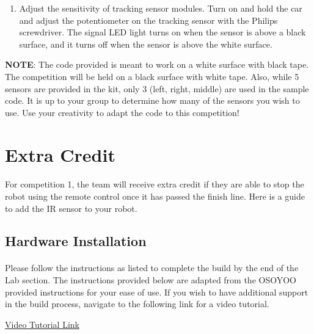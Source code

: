 \documentclass{article}
\begin{document}
\begin{enumerate}
	\item Adjust the sensitivity of tracking sensor modules. Turn on and hold the car and adjust the potentiometer on the tracking sensor with the Philips screwdriver. The signal LED light turns on when the sensor is above a black surface, and it turns off when the sensor is above the white surface.
	
\end{enumerate}
	
\textbf{NOTE}: The code provided is meant to work on a white surface with black tape. The competition will be held on a black surface with white tape. Also, while 5 sensors are provided in the kit, only 3 (left, right, middle) are used in the sample code. It is up to your group to determine how many of the sensors you wish to use. Use your creativity to adapt the code to this competition! 

\section{Extra Credit}

\paragraph{}For competition 1, the team will receive extra credit if they are able to stop the robot using the remote control once it has passed the finish line. Here is a guide to add the IR sensor to your robot.

\subsection{Hardware Installation}

\paragraph{}Please follow the instructions as listed to complete the build by the end of the Lab section. The instructions provided below are adapted from the OSOYOO provided instructions for your ease of use. If you wish to have additional support in the build process, navigate to the following link for a video tutorial. 

\href{https://osoyoo.com/2020/05/12/osoyoo-v2-1-robot-car-kit-lesson-2-ir-remote-control-robot-car/}{Video Tutorial Link}
\end{document}
